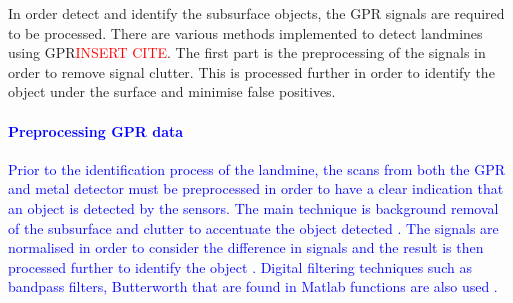 \documentclass[main.tex]{subfiles}
\begin{document}
In order detect and identify the subsurface objects, the GPR signals are required to be processed. There are various methods implemented to detect landmines using GPR\textcolor{red}{INSERT CITE}. The first part is the preprocessing of the signals in order to remove signal clutter. This is processed further in order to identify the object under the surface and minimise false positives.    

\textcolor{blue}
{\paragraph{Preprocessing GPR data}
Prior to the identification process of the landmine, the scans from both the GPR and metal detector must be preprocessed in order to have a clear indication that an object is detected by the sensors. The main technique is background removal of the subsurface and clutter to accentuate the object detected \parencite{ko2012gpr,kruger2006new}. The signals are normalised in order to consider the difference in signals and the result is then processed further to identify the object \parencite{ko2012gpr}. Digital filtering techniques such as bandpass filters, Butterworth that are found in Matlab functions are also used \parencite{}.
}
\end{document}
